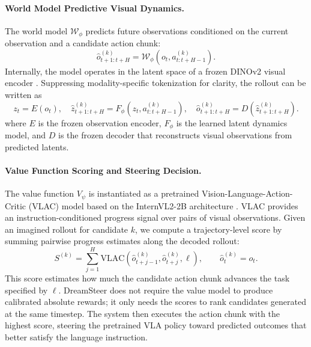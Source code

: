 \paragraph{World Model Predictive Visual Dynamics.}
The world model $\mathcal{W}_\phi$ predicts future observations conditioned on the current observation and a candidate action chunk:
\[
\hat{o}^{(k)}_{t+1:t+H}
=
\mathcal{W}_\phi(o_t,a^{(k)}_{t:t+H-1}).
\]
Internally, the model operates in the latent space of a frozen DINOv2 visual encoder \citep{oquab2023dinov2}. Suppressing modality-specific tokenization for clarity, the rollout can be written as
\begin{equation}
z_t = E(o_t), \quad
\hat{z}^{(k)}_{t+1:t+H}
=
F_\phi\!\left(z_t,a^{(k)}_{t:t+H-1}\right), \quad
\hat{o}^{(k)}_{t+1:t+H}
=
D\!\left(\hat{z}^{(k)}_{t+1:t+H}\right).
\end{equation}
where $E$ is the frozen observation encoder, $F_\phi$ is the learned latent dynamics model, and $D$ is the frozen decoder that reconstructs visual observations from predicted latents. 

\paragraph{Value Function Scoring and Steering Decision.}
The value function $V_\psi$ is instantiated as a pretrained Vision-Language-Action-Critic (VLAC) model \citep{zhai2025vision} based on the InternVL2-2B architecture \citep{chen2024expanding}. VLAC provides an instruction-conditioned progress signal over pairs of visual observations. Given an imagined rollout for candidate $k$, we compute a trajectory-level score by summing pairwise progress estimates along the decoded rollout:
\begin{equation}
S^{(k)}
=
\sum_{j=1}^{H}
\mathrm{VLAC}
\!\left(
    \hat{o}^{(k)}_{t+j-1},
    \hat{o}^{(k)}_{t+j},
    \ell
\right),
\qquad
\hat{o}^{(k)}_{t} = o_t .
\end{equation}
This score estimates how much the candidate action chunk advances the task specified by $\ell$. DreamSteer does not require the value model to produce calibrated absolute rewards; it only needs the scores to rank candidates generated at the same timestep. The system then executes the action chunk with the highest score, steering the pretrained VLA policy toward predicted outcomes that better satisfy the language instruction.


